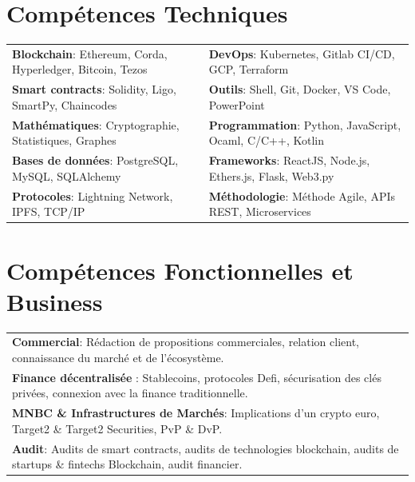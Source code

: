 \documentclass[10pt]{article}
\begin{document}
\vspace{2ex}

\section*{Compétences Techniques}

\vspace{2ex}

\begin{tabular}{ l l }
\textbf{Blockchain}: Ethereum, Corda, Hyperledger, Bitcoin, Tezos & \textbf{DevOps}: Kubernetes, Gitlab CI/CD, GCP, Terraform \\[0.1cm]
\textbf{Smart contracts}: Solidity, Ligo, SmartPy, Chaincodes & \textbf{Outils}: Shell, Git, Docker, VS Code, PowerPoint \\[0.1cm]
\textbf{Mathématiques}: Cryptographie, Statistiques, Graphes & \textbf{Programmation}: Python, JavaScript, Ocaml, C/C++, Kotlin \\[0.1cm]
\textbf{Bases de données}: PostgreSQL, MySQL, SQLAlchemy & \textbf{Frameworks}: ReactJS, Node.js, Ethers.js, Flask, Web3.py \\[0.1cm]
\textbf{Protocoles}: Lightning Network, IPFS, TCP/IP & \textbf{Méthodologie}: Méthode Agile, APIs REST, Microservices \\[0.1cm]
\end{tabular}

\vspace{2ex}

\section*{Compétences Fonctionnelles et Business}

\vspace{2ex}

\begin{tabular}{ l }
\textbf{Commercial}: Rédaction de propositions commerciales, relation client, connaissance du marché et de l'écosystème.\\[0.1cm]
\textbf{Finance décentralisée} : Stablecoins, protocoles Defi, sécurisation des clés privées, connexion avec la finance traditionnelle.\\[0.1cm]
\textbf{MNBC \& Infrastructures de Marchés}: Implications d'un crypto euro, Target2 \& Target2 Securities, PvP \& DvP.\\[0.1cm]
\textbf{Audit}: Audits de smart contracts, audits de technologies blockchain, audits de startups \& fintechs Blockchain, audit financier.\\[0.1cm]
\end{tabular}
\end{document}
